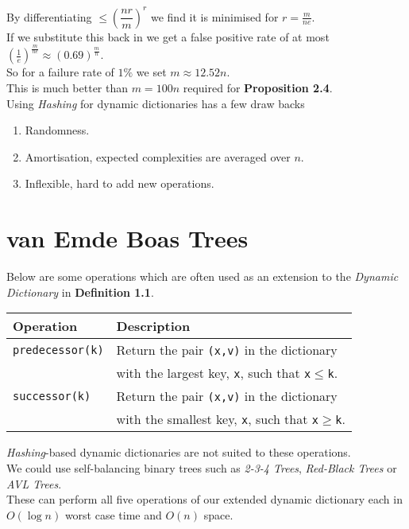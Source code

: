 \documentclass[11pt,a4paper]{article}
\begin{document}
By differentiating $\leq\left(\dfrac{nr}{m}\right)^r$ we find it is minimised for $r=\frac{m}{ne}$.\\
If we substitute this back in we get a false positive rate of at most $\left(\frac1e\right)^{\frac{m}{ne}}\approx(0.69)^\frac{m}{n}$.\\
So for a failure rate of $1\%$ we set $m\approx12.52 n$.\\
This is much better than $m=100n$ required for \textbf{Proposition 2.4}.\\

Using \textit{Hashing} for dynamic dictionaries has a few draw backs
\begin{enumerate}
	\item Randomness.
	\item Amortisation, \ie expected complexities are averaged over $n$.
	\item Inflexible, hard to add new operations.
\end{enumerate}

\section{van Emde Boas Trees}

Below are some operations which are often used as an extension to the \textit{Dynamic Dictionary} in \textbf{Definition 1.1}.
\begin{center}
\begin{tabular}{l|l}
\textbf{Operation}&\textbf{Description}\\\hline
\lstinline!predecessor(k)!&Return the pair \lstinline!(x,v)! in the dictionary\\
&with the largest key,  \lstinline!x!, such that \lstinline!x!$\leq$\lstinline!k!.\\
\lstinline!successor(k)!&Return the pair \lstinline!(x,v)! in the dictionary\\
&with the smallest key,  \lstinline!x!, such that \lstinline!x!$\geq$\lstinline!k!.\\
\end{tabular}
\end{center}
\nb \textit{Hashing}-based dynamic dictionaries are not suited to these operations.\\

We could use self-balancing binary trees such as \textit{2-3-4 Trees}, \textit{Red-Black Trees} or \textit{AVL Trees}.\\
These can perform all five operations of our extended dynamic dictionary each in $O(\log n)$ worst case time and $O(n)$ space.\\
\end{document}
